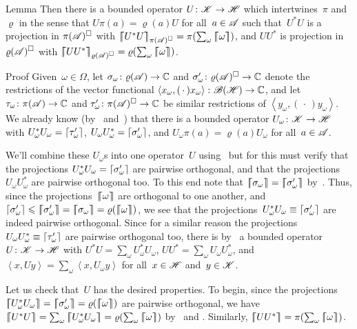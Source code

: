 \documentclass[a]{subfiles}
\begin{document}
\begin{parsec}
\begin{point}{Lemma}
Then there is a bounded operator $U\colon \mathscr{K}\to\mathscr{H}$
which intertwines~$\pi$ and~$\varrho$
in the sense that $U \pi(a)=\varrho(a) U$
for all~$a\in \mathscr{A}$
such that~$U^*U$
is a projection in
$\pi(\mathscr{A})^\square$
with
$\cceil{U^*U}_{\pi(\scrA)^\square}=\pi(\sum_\omega \cceil{\omega})$,
and 
$UU^*$
is projection in
$\varrho(\mathscr{A})^\square$
with
$\cceil{UU^*}_{\varrho(\scrA)^\square}=\varrho(\sum_\omega \cceil{\omega})$.
\begin{point}{Proof}%
Given~$\omega\in\Omega$,
let $\sigma_\omega\colon \varrho(\mathscr{A})\to \mathbb{C}$
and $\sigma_\omega'\colon \varrho(\mathscr{A})^\square\to\mathbb{C}$
denote the restrictions
of the vector functional $\left<x_\omega,(\,\cdot\,)x_\omega\right>
\colon \mathscr{B}(\mathscr{H})\to\mathbb{C}$,
and let  $\tau_\omega\colon \pi(\mathscr{A})\to \mathbb{C}$
and $\tau_\omega'\colon \pi(\mathscr{A})^\square\to\mathbb{C}$
be similar restrictions
of $\left<y_\omega,(\,\cdot\,)y_\omega\right>$.
We already know (by~
and~)
that
there is
a bounded operator $U_\omega\colon \mathscr{K}\to\mathscr{H}$
with $U_\omega^*U_\omega = \left\lceil\tau_\omega'\right\rceil$,
$U_\omega U_\omega^* = \left\lceil\sigma_\omega'\right\rceil$,
and $U_\omega \pi(a) = \varrho(a) U_\omega$
for all~$a\in\mathscr{A}$.

We'll combine these $U_\omega$s into one operator~$U$
using~ but for this must
verify that the projections $U_\omega^* U_\omega=\left\lceil\sigma_\omega'\right\rceil$
are pairwise orthogonal,
and that the projections $U_\omega U_\omega^*$
are pairwise orthogonal too.
To this end note that
$\cceil{\sigma_\omega}=\cceil{\sigma_\omega'}$
by~.
Thus, since the projections~$\left\lceil\!\!\left\lceil\omega\right\rceil\!\!\right\rceil$
are orthogonal to one another,
and $\ceil{\sigma_\omega'}\leq \cceil{\sigma_\omega'}
= \cceil{\sigma_\omega} =\varrho(\cceil{\omega})$,
we see that the projections~$U^*_\omega U_\omega \equiv 
\left\lceil\sigma_\omega'\right\rceil$
are indeed pairwise orthogonal.
Since for a similar reason
the projections $U_\omega U_\omega^*
\equiv \left\lceil\tau_\omega'\right\rceil$ are pairwise orthogonal too,
there is by~
a bounded operator $U\colon \mathscr{K}\to\mathscr{H}$
with 
$U^*U = \sum_\omega U_\omega^* U_\omega$,
$UU^* = \sum_\omega U_\omega U_\omega^*$,
and $\left<x,Uy\right>=\sum_\omega \left<x,U_\omega y\right>$
for all~$x\in\mathscr{H}$ and~$y\in \mathscr{K}$.

Let us check that~$U$ has the desired properties.
To begin, since the projections
$\cceil{U_\omega^*U_\omega}=\cceil{\sigma_\omega'}=\varrho(\cceil{\omega})$
are pairwise orthogonal,
we have $\cceil{U^*U}=\sum_\omega \cceil{U_\omega^* U_\omega}
=  \varrho(\sum_\omega \cceil{\omega})$
by~ and
.
Similarly, $\cceil{UU^*}= \pi(\sum_\omega \cceil{\omega})$.


\end{point}
\end{point}
\end{parsec}
\end{document}
